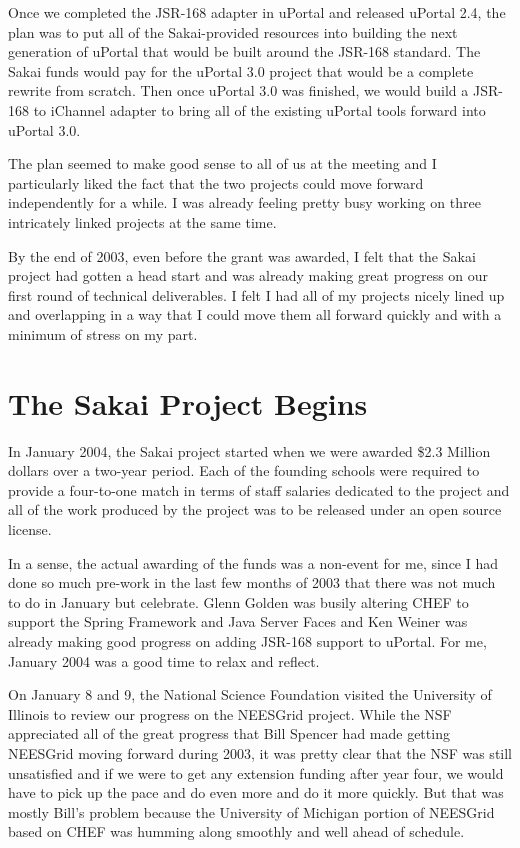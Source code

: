 \documentclass[12pt]{book}
\begin{document}
Once we completed the JSR-168 adapter in uPortal and released uPortal 2.4, the
plan was to put all of the Sakai-provided resources into building the next generation
of uPortal that would be built around the JSR-168 standard.
The Sakai funds would pay for the uPortal 3.0 project that would be a complete
rewrite from scratch.   Then once uPortal 3.0 was finished, we would build a
JSR-168 to iChannel adapter to bring all of the existing uPortal tools forward
into uPortal 3.0.

The plan seemed to make good sense to all of us at the meeting and I particularly
liked the fact that the two projects could move forward independently for a while.
I was already feeling pretty busy working on three intricately linked
projects at the same time.

By the end of 2003, even before the grant was awarded, I felt that the Sakai project
had gotten a head start and was already making great progress on our first round of
technical deliverables.  I felt I had all of my projects nicely lined up and overlapping
in a way that I could move them all forward quickly and with a minimum of stress
on my part.

\chapter{The Sakai Project Begins}

In January 2004, the Sakai project started when we were awarded \$2.3 Million dollars
over a two-year period.   Each of the founding schools were required to provide a
four-to-one match in terms of staff salaries dedicated to the project and all of the work
produced by the project was to be released under an open source license.

In a sense, the actual awarding of the funds was a non-event for me,
since I had done so much pre-work in the last
few months of 2003 that there was not much to do in January but celebrate.
Glenn Golden was busily altering CHEF to support the Spring Framework and Java Server
Faces and Ken Weiner was already making good progress on adding JSR-168 support
to uPortal.  For me, January 2004 was a good time to relax and reflect.

On January 8 and 9, the National Science Foundation visited the University
of Illinois to review our progress
on the NEESGrid project.   While the NSF appreciated all of the
great progress that Bill Spencer had made getting NEESGrid moving
forward during 2003, it was pretty clear that the NSF was still
unsatisfied and if we were to get any extension funding after year four, we would have
to pick up the pace and do even more and do it more quickly.  But that was mostly
Bill's problem because the University of Michigan portion of NEESGrid based
on CHEF was humming along smoothly and well ahead of schedule.
\end{document}
